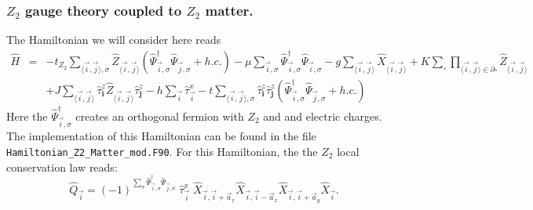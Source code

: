 \subsubsection{$Z_2$ gauge theory coupled to $Z_2$ matter.   }
\label{Z2.Sec}
The Hamiltonian we will consider here reads
\begin{eqnarray}
	\hat{H} & = & -  t_{Z_2} \sum_{\langle \vec{i}, \vec{j} \rangle, \sigma } \hat{Z}_{\langle \vec{i}, \vec{j} \rangle}
	\left(\hat{\Psi}^{\dagger}_{\vec{i},\sigma} \hat{\Psi}^{\phantom{\dagger}}_{\vec{j},\sigma}   + h.c. \right) - \mu \sum_{\vec{i},\sigma} \hat{\Psi}^{\dagger}_{\vec{i},\sigma} \hat{\Psi}^{\phantom{\dagger}}_{\vec{i},\sigma}  
	-g \sum_{\langle \vec{i}, \vec{j} \rangle } \hat{X}_{\langle \vec{i}, \vec{j} \rangle }  +
	  K \sum_{\square} \prod_{\langle \vec{i}, \vec{j} \rangle \in \partial \square} \hat{Z}_{\langle \vec{i}, \vec{j} \rangle}  \nonumber \\
	& &  + J  \sum_{\langle \vec{i}, \vec{j} \rangle}  \hat{\tau}^z_{\pmb{i}}  \hat{Z}_{\langle \vec{i}, \vec{j} \rangle} \hat{\tau}^z_{\pmb{j}}   
	      -  h \sum_{ \vec{i} } \hat{\tau}^x_{\vec{i}}   - t  \sum_{\langle \vec{i}, \vec{j} \rangle, \sigma }   \hat{\tau}^z_{\pmb{i}}   \hat{\tau}^z_{\pmb{j}}  \left( \hat{\Psi}^{\dagger}_{\vec{i},\sigma} \hat{\Psi}^{\phantom{\dagger}}_{\vec{j},\sigma} 	+ h.c. \right)
\end{eqnarray}  
Here the  $\hat{\Psi}^{\dagger}_{\vec{i},\sigma}$  creates an orthogonal fermion with $Z_2$ and  and electric charges.    
The implementation of this Hamiltonian can be found in the file \texttt{Hamiltonian\_Z2\_Matter\_mod.F90}.
 For this Hamiltonian, the the $Z_2$ local conservation law reads: 
\begin{equation}
	\hat{Q}_{\vec{i}} =  (-1)^{\sum_{\sigma} \hat{\Psi}^{\dagger}_{\vec{i},\sigma} \hat{\Psi}^{\phantom{\dagger}}_{\vec{j},\sigma}   } 
	\;  \hat{\tau}^{x}_{\vec{i}}  \; \hat{X}_{\vec{i},\vec{i} +  \vec{a}_x} \hat{X}_{\vec{i},\vec{i} -  \vec{a}_x} \hat{X}_{\vec{i},\vec{i} +  \vec{a}_y} \hat{X}_{\vec{i}}.
\end{equation} 

